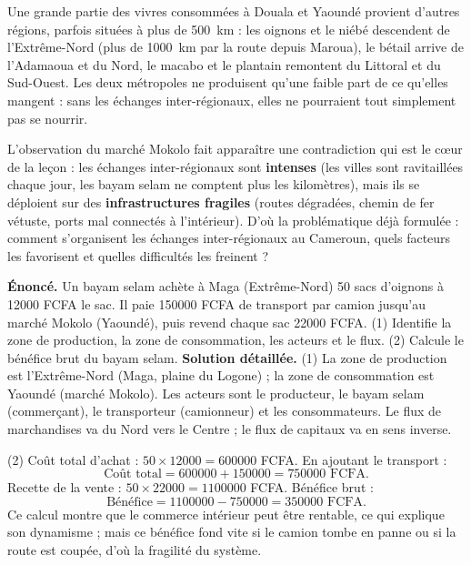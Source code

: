 \documentclass[11pt]{article}
\newcounter{popsec}
\newcounter{popsub}
\newcommand{\courssub}[1]{%
  \stepcounter{popsub}%
  \par\vspace{9pt}\noindent{\popxbold\fontsize{11.5}{13}\selectfont\color{popink}{\color{poporange}\thepopsec.\thepopsub}\hspace{6pt}#1}\par\nopagebreak\vspace{4pt}
}
\begin{document}
\begin{savaistu}
Une grande partie des vivres consommées à Douala et Yaoundé provient d'autres régions, parfois situées à plus de \SI{500}{km} : les oignons et le niébé descendent de l'Extrême-Nord (plus de \SI{1000}{km} par la route depuis Maroua), le bétail arrive de l'Adamaoua et du Nord, le macabo et le plantain remontent du Littoral et du Sud-Ouest. Les deux métropoles ne produisent qu'une faible part de ce qu'elles mangent : sans les échanges inter-régionaux, elles ne pourraient tout simplement pas se nourrir.
\end{savaistu}

\courssub{De la situation-problème à la problématique}

L'observation du marché Mokolo fait apparaître une contradiction qui est le cœur de la leçon : les échanges inter-régionaux sont \textbf{intenses} (les villes sont ravitaillées chaque jour, les bayam selam ne comptent plus les kilomètres), mais ils se déploient sur des \textbf{infrastructures fragiles} (routes dégradées, chemin de fer vétuste, ports mal connectés à l'intérieur). D'où la problématique déjà formulée : comment s'organisent les échanges inter-régionaux au Cameroun, quels facteurs les favorisent et quelles difficultés les freinent ?

\begin{exoresolu}
\textbf{Énoncé.} Un bayam selam achète à Maga (Extrême-Nord) 50 sacs d'oignons à \num{12000} FCFA le sac. Il paie \num{150000} FCFA de transport par camion jusqu'au marché Mokolo (Yaoundé), puis revend chaque sac \num{22000} FCFA. (1) Identifie la zone de production, la zone de consommation, les acteurs et le flux. (2) Calcule le bénéfice brut du bayam selam.
\tcblower
\textbf{Solution détaillée.}
(1) La zone de production est l'Extrême-Nord (Maga, plaine du Logone) ; la zone de consommation est Yaoundé (marché Mokolo). Les acteurs sont le producteur, le bayam selam (commerçant), le transporteur (camionneur) et les consommateurs. Le flux de marchandises va du Nord vers le Centre ; le flux de capitaux va en sens inverse.

(2) Coût total d'achat : $50 \times \num{12000} = \num{600000}$ FCFA. En ajoutant le transport :
\[ \text{Coût total} = \num{600000} + \num{150000} = \num{750000} \text{ FCFA}. \]
Recette de la vente : $50 \times \num{22000} = \num{1100000}$ FCFA. Bénéfice brut :
\[ \text{Bénéfice} = \num{1100000} - \num{750000} = \num{350000} \text{ FCFA}. \]
Ce calcul montre que le commerce intérieur peut être rentable, ce qui explique son dynamisme ; mais ce bénéfice fond vite si le camion tombe en panne ou si la route est coupée, d'où la fragilité du système.
\end{exoresolu}
\end{document}
